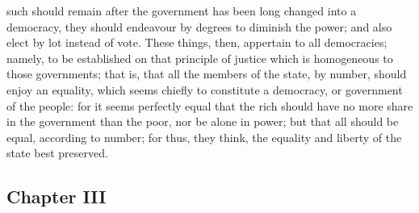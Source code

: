 \documentclass[12pt]{article}
\begin{document}
such should remain after the government has been long changed into a democracy, they should endeavour by degrees to diminish the power; and also elect by lot instead of vote. These things, then, appertain to all democracies; namely, to be established on that principle of justice which is homogeneous to those governments; that is, that all the members of the state, by number, should enjoy an equality, which seems chiefly to constitute a democracy, or government of the people: for it seems perfectly equal that the rich should have no more share in the government than the poor, nor be alone in power; but that all should be equal, according to number; for thus, they think, the equality and liberty of the state best preserved.

\subsection*{Chapter III}
\end{document}
